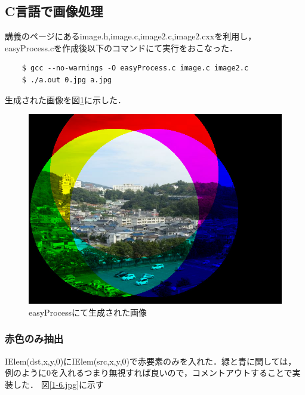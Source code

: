 \documentclass[11pt]{jarticle}
\begin{document}
\subsection{C言語で画像処理}
講義のページにあるimage.h,image.c,image2.c,image2.cxxを利用し，
easyProcess.cを作成後以下のコマンドにて実行をおこなった．

\begin{verbatim}
    $ gcc --no-warnings -O easyProcess.c image.c image2.c
    $ ./a.out 0.jpg a.jpg
\end{verbatim}

生成された画像を図\ref{1-5.jpg}に示した．
\begin{figure}[htbp]
    \centering
    \includegraphics[scale=.2]{1-5.jpg}
    \caption{easyProcessにて生成された画像}
    \label{1-5.jpg}
\end{figure}

\subsubsection{赤色のみ抽出}
IElem(dst,x,y,0)にIElem(src,x,y,0)で赤要素のみを入れた．緑と青に関しては，
例のように0を入れるつまり無視すれば良いので，コメントアウトすることで実装した．
図\ref{1-6.jpg}に示す
\end{document}
